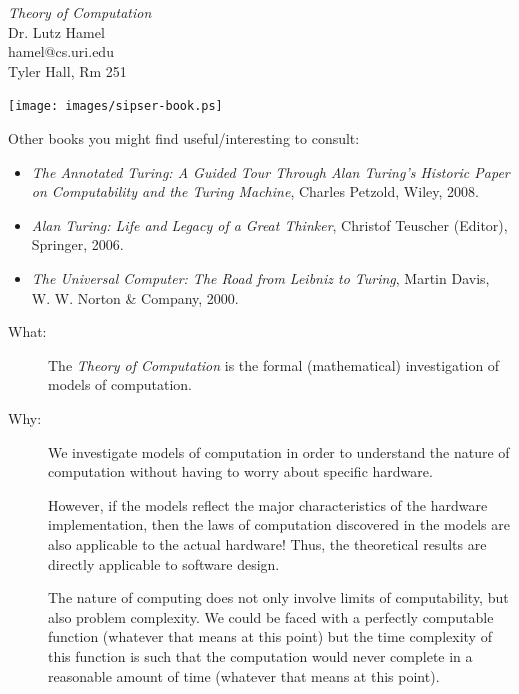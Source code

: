 \documentclass[a4paper,blends,pdf,colorBG,slideColor]{prosper}
\begin{document}
\begin{center}
	{\LARGE\em Theory of Computation}\\

	Dr. Lutz Hamel\\
	hamel@cs.uri.edu\\
	Tyler Hall, Rm 251\\
	\vspace{.3in}

    \texttt{[image: images/sipser-book.ps]}
\end{center}

\es

{\small
Other books you might find useful/interesting to consult:
\begin{itemize}
\item {\em The Annotated Turing: A Guided Tour Through Alan Turing's Historic Paper on Computability and the Turing Machine},  Charles Petzold, Wiley,  2008.
\item {\em Alan Turing: Life and Legacy of a Great Thinker}, Christof Teuscher (Editor), Springer, 2006.
\item {\em The Universal Computer: The Road from Leibniz to Turing}, Martin Davis, W. W. Norton \& Company, 2000.
\end{itemize}
}
\es

\begin{description}
\item[What:] The {\em Theory of Computation} is the formal (mathematical) investigation of models of computation.

\item[Why:] We investigate models of computation in order to understand the nature of computation without having to worry about specific hardware.  

However, if the models reflect the major characteristics 
of the hardware implementation, then the laws of computation discovered in the models are also 
applicable to the actual hardware!  Thus, the theoretical results are directly applicable to software design.

The nature of computing does not only involve limits of computability, but also problem complexity.  We could be faced
with a perfectly computable function (whatever that means at this point) but the time complexity of this function is such that the computation would never complete in a reasonable amount
of time  (whatever that means at this point).

\end{description}
\es
\end{document}
